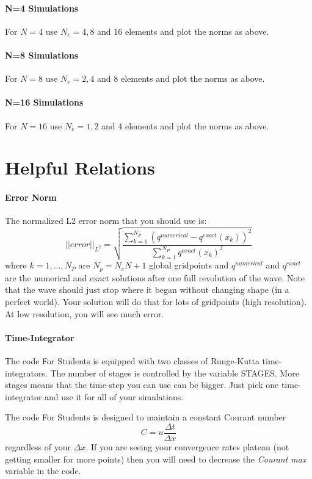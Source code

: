\documentclass[10pt]{article}
\newcommand{\be}{\begin{equation}}
\newcommand{\ee}{\end{equation}}
\begin{document}
\paragraph{N=4 Simulations}
For $N=4$ use $N_e=4, 8$ and 16 elements and plot the norms as above.

\paragraph{N=8 Simulations}
For $N=8$ use $N_e=2,4$ and 8 elements and plot the norms as above.

\paragraph{N=16 Simulations}
For $N=16$ use $N_e=1,2$ and 4 elements and plot the norms as above.

\section{Helpful Relations}

\paragraph{Error Norm}
The normalized L2 error norm that you should use is:
\be
||error||_{L^2} = \sqrt{ \frac{ \sum_{k=1}^{N_P}  \left( q^{numerical} - q^{exact}(x_k) \right)^2}{ \sum_{k=1}^{N_P} q^{exact}(x_k) ^2} }
\ee
where $k=1,...,N_P$ are $N_p=N_e N + 1 $ global gridpoints and $q^{numerical}$ and $q^{exact}$ are the numerical and exact solutions after one 
full revolution of the wave. Note that the wave should just stop where it began without changing shape (in a perfect world). Your solution will do that for lots of gridpoints (high resolution). At low resolution, you will see much error.

\paragraph{Time-Integrator}
The code For Students is equipped with two classes of Runge-Kutta time-integrators. The number of stages is controlled by the variable STAGES.  More stages means that the time-step you can use can be bigger.  Just pick one time-integrator and use it for all of your simulations.

The code For Students is designed to maintain a constant Courant number
\[
C=u \frac{\Delta t}{\Delta x}
\]
regardless of your $\Delta x$. If you are seeing your convergence rates plateau (not getting smaller for more points) then you will need to decrease the  \emph{Courant max} variable in the code.
\end{document}
